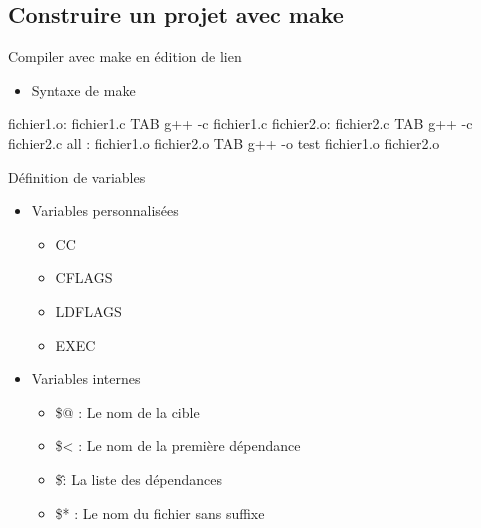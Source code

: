 \documentclass{beamer}
\begin{document}
\subsection{Construire un projet avec make}

\begin{frame}{Compiler avec make en \'edition de lien}
   \begin{itemize}
        \item Syntaxe de make  
    \end{itemize}

    fichier1.o: fichier1.c
	\newline TAB g++ -c fichier1.c
    \newline
	\newline fichier2.o: fichier2.c
	\newline TAB g++ -c fichier2.c
    \newline
    \newline all : fichier1.o fichier2.o 
    \newline TAB g++ -o test fichier1.o fichier2.o
\end{frame}

\begin{frame}{ D\'efinition de variables}
  
  \begin{itemize}
    \item Variables personnalis\'ees
        \begin{itemize}
            \item CC
            \item CFLAGS
            \item LDFLAGS
            \item EXEC
        \end{itemize}
    
        \item   Variables internes
        
        \begin{itemize}
            \item \$@ : Le nom de la cible
            \item \$< : Le nom de la premi\`ere d\'ependance
            \item \$\^ : La liste des d\'ependances
            \item \$* : Le nom du fichier sans suffixe
        \end{itemize}
     \end{itemize}
\end{frame}
\end{document}

